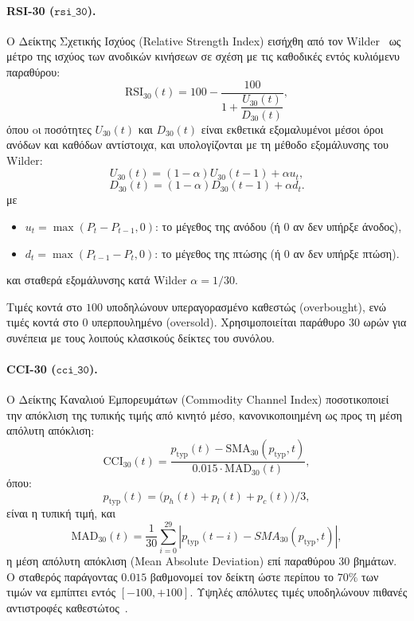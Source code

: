 \paragraph{RSI-30 ($\mathtt{rsi\_30}$).}
Ο Δείκτης Σχετικής Ισχύος (Relative Strength Index) εισήχθη από τον
Wilder~\cite{wilder1978} ως μέτρο της ισχύος των ανοδικών κινήσεων σε σχέση με τις
καθοδικές εντός κυλιόμενυ παραθύρου:
\begin{equation}
  \mathrm{RSI}_{30}(t) = 100 - \frac{100}{1 + \dfrac{U_{30}(t)}{D_{30}(t)}},
  \label{eq:rsi}
\end{equation}
όπου oι ποσότητες $U_{30}(t)$ και $D_{30}(t)$ είναι εκθετικά εξομαλυμένοι 
μέσοι όροι ανόδων και καθόδων αντίστοιχα, και υπολογίζονται με τη μέθοδο εξομάλυνσης του Wilder:
\begin{equation}
  U_{30}(t) = (1-\alpha)U_{30}(t-1) + \alpha u_t,
\end{equation}
\begin{equation}
  D_{30}(t) = (1-\alpha)D_{30}(t-1) + \alpha d_t.
\end{equation}
με
\begin{itemize}
    \item $u_t = \max(P_t - P_{t-1}, 0)$: το μέγεθος της ανόδου (ή $0$ αν δεν υπήρξε άνοδος),
    \item $d_t = \max(P_{t-1} - P_t, 0)$: το μέγεθος της πτώσης (ή $0$ αν δεν υπήρξε πτώση).
\end{itemize}
και σταθερά εξομάλυνσης κατά Wilder $\alpha = 1/30$. 

Τιμές κοντά στο $100$ υποδηλώνουν υπεραγορασμένο καθεστώς (overbought), 
ενώ τιμές κοντά στο $0$ υπερπουλημένο (oversold). Χρησιμοποιείται 
παράθυρο $30$ ωρών για συνέπεια με τους λοιπούς κλασικούς δείκτες του συνόλου.

\paragraph{CCI-30 ($\mathtt{cci\_30}$).}
Ο Δείκτης Καναλιού Εμπορευμάτων (Commodity Channel Index) ποσοτικοποιεί την
απόκλιση της τυπικής τιμής από κινητό μέσο, κανονικοποιημένη ως προς τη μέση
απόλυτη απόκλιση:
\begin{equation}
  \mathrm{CCI}_{30}(t) = \frac{p_{\mathrm{typ}}(t) - \mathrm{SMA}_{30}(p_{\mathrm{typ}}, t)}
                              {0{.}015 \cdot \mathrm{MAD}_{30}(t)},
  \label{eq:cci}
\end{equation}
όπου: 
\begin{equation*}
  p_{\mathrm{typ}}(t) = \bigl(p_h(t) + p_l(t) + p_c(t)\bigr)/3,
\end{equation*}
είναι η τυπική τιμή, και 
\begin{equation}
\mathrm{MAD}_{30}(t)=\frac{1}{30}\sum_{i=0}^{29}\left|p_{\mathrm{typ}}(t-i)-SMA_{30}(p_{\mathrm{typ}}, t)\right|,
\end{equation}
η μέση απόλυτη απόκλιση (Mean Absolute Deviation) επί παραθύρου
$30$ βημάτων. Ο σταθερός παράγοντας $0{.}015$ βαθμονομεί τον δείκτη ώστε
περίπου το $70\%$ των τιμών να εμπίπτει εντός $[-100, +100]$. Υψηλές απόλυτες
τιμές υποδηλώνουν πιθανές αντιστροφές καθεστώτος~\cite{murphy1999technical}.

